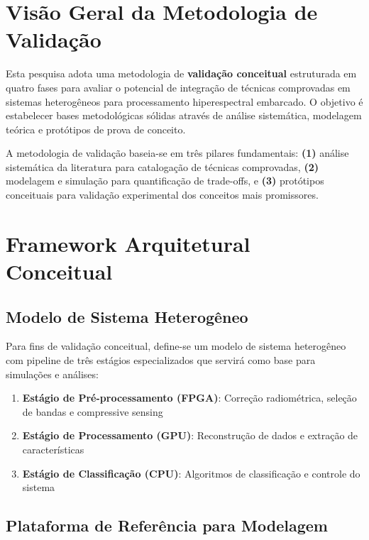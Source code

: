 
\section{Visão Geral da Metodologia de Validação}

Esta pesquisa adota uma metodologia de \textbf{validação conceitual} estruturada em quatro fases para avaliar o potencial de integração de técnicas comprovadas em sistemas heterogêneos para processamento hiperespectral embarcado. O objetivo é estabelecer bases metodológicas sólidas através de análise sistemática, modelagem teórica e protótipos de prova de conceito.

A metodologia de validação baseia-se em três pilares fundamentais: \textbf{(1)} análise sistemática da literatura para catalogação de técnicas comprovadas, \textbf{(2)} modelagem e simulação para quantificação de trade-offs, e \textbf{(3)} protótipos conceituais para validação experimental dos conceitos mais promissores.

\section{Framework Arquitetural Conceitual}

\subsection{Modelo de Sistema Heterogêneo}

Para fins de validação conceitual, define-se um modelo de sistema heterogêneo com pipeline de três estágios especializados que servirá como base para simulações e análises:

\begin{enumerate}
\item \textbf{Estágio de Pré-processamento (FPGA)}: Correção radiométrica, seleção de bandas e compressive sensing
\item \textbf{Estágio de Processamento (GPU)}: Reconstrução de dados e extração de características
\item \textbf{Estágio de Classificação (CPU)}: Algoritmos de classificação e controle do sistema
\end{enumerate}

\subsection{Plataforma de Referência para Modelagem}

